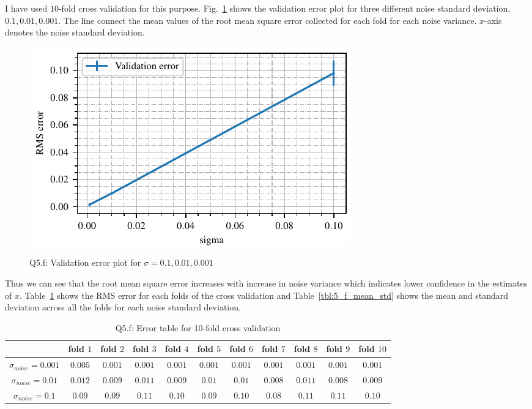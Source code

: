 I have used $10$-fold cross validation for this purpose. Fig.~\ref{fig:q5_val_error} shows the validation error plot for three different noise standard deviation, $0.1, 0.01, 0.001$. The line connect the mean values of the root mean square error collected for each fold for each noise variance. $x$-axis denotes the noise standard deviation.
\begin{figure}[h]
	\centering
	\includegraphics[scale=1.0,trim={0cm 0cm 0cm 0cm},clip]{./code/generatedPlots/val_error.pdf}
	\label{fig:q5_val_error}
	\caption{Q5.f: Validation error plot for $\sigma=0.1, 0.01, 0.001$}
\end{figure}
Thus we can see that the root mean square error increases with increase in noise variance which indicates lower confidence in the estimates of $x$. Table~\ref{tbl:5_f_folds} shows the RMS error for each folds of the cross validation and Table~\ref{tbl:5_f_mean_std} shows the mean and standard deviation across all the folds for each noise standard deviation.
\begin{table}[ht]
	\centering
	\caption{Q5.f: Error table for 10-fold cross validation}
	\begin{tabular}[t]{ccccccccccc} 
		\hline
		& fold $1$ & fold $2$ & fold $3$ & fold $4$ & fold $5$ & fold $6$ & fold $7$ & fold $8$ & fold $9$ & fold $10$\\ [0.5ex] 
		\hline
		$\sigma_{noise}=0.001$ & $0.005$ & $0.001$ & $0.001$ & $0.001$ & $0.001$ & $0.001$ & $0.001$ & $0.001$ & $0.001$ & $0.001$\\
		$\sigma_{noise}=0.01$ & $0.012$ & $0.009$ & $0.011$ & $0.009$ & $0.01$ & $0.01$ & $0.008$ & $0.011$ & $0.008$ & $0.009$\\
		$\sigma_{noise}=0.1$ & $0.09$ & $0.09$ & $0.11$ & $0.10$ & $0.09$ & $0.10$ & $0.08$ & $0.11$ & $0.11$ & $0.10$\\[1ex]
		\hline
	\end{tabular}
	\label{tbl:5_f_folds}
\end{table}
